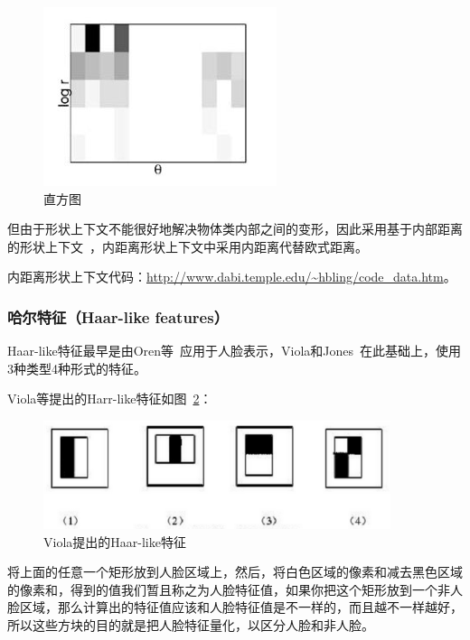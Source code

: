 \documentclass[12pt]{article}
\begin{document}
\begin{enumerate}
\begin{figure}
\begin{minipage}[t]{0.47\linewidth}
              \centering
              \includegraphics[width=0.6\linewidth]{his}
              \caption{直方图}
              \label{fig:his}
              \end{minipage}
            \end{figure}  
    \end{enumerate}
    但由于形状上下文不能很好地解决物体类内部之间的变形，因此采用基于内部距离的形状上下文~\cite{ling2007shape}，内距离形状上下文中采用内距离代替欧式距离。
    
{\color{blue}内距离形状上下文代码}：\url{http://www.dabi.temple.edu/~hbling/code_data.htm}。


\subsubsection{哈尔特征（Haar-like features）}

Haar-like特征最早是由Oren等~\cite{oren1997pedestrian}应用于人脸表示，Viola和Jones~\cite{viola2001rapid}在此基础上，使用3种类型4种形式的特征。

Viola等提出的Harr-like特征如图~\ref{fig: Viola_Haar-like}：

\begin{figure}[!ht]
\centering
\includegraphics[width=4in]{Viola_Haar-like}
\caption{Viola提出的Haar-like特征}
\label{fig: Viola_Haar-like}
\end{figure}

将上面的任意一个矩形放到人脸区域上，然后，将白色区域的像素和减去黑色区域的像素和，得到的值我们暂且称之为人脸特征值，如果你把这个矩形放到一个非人脸区域，那么计算出的特征值应该和人脸特征值是不一样的，而且越不一样越好，所以这些方块的目的就是把人脸特征量化，以区分人脸和非人脸。
\end{document}
